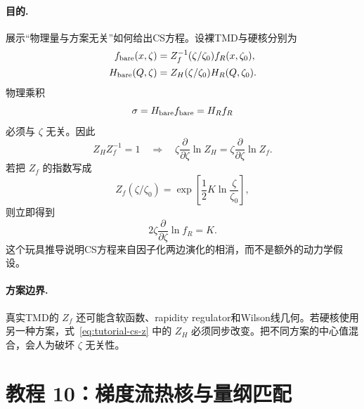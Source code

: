 \documentclass[UTF8,12pt,a4paper,twoside,openany]{ctexbook}
\begin{document}
\paragraph{目的.} 展示“物理量与方案无关”如何给出CS方程。设裸TMD与硬核分别为
\begin{align}
  f_{\rm bare}(x,\zeta)
  &=Z_f^{-1}(\zeta/\zeta_0)f_R(x,\zeta_0),\\
  H_{\rm bare}(Q,\zeta)
  &=Z_H(\zeta/\zeta_0)H_R(Q,\zeta_0).
\end{align}
物理乘积
\begin{equation}
  \sigma=H_{\rm bare}f_{\rm bare}
  =H_Rf_R
  \label{eq:tutorial-cs-product}
\end{equation}
必须与 \(\zeta\) 无关。因此
\begin{equation}
  Z_HZ_f^{-1}=1
  \quad\Longrightarrow\quad
  \zeta\frac{\partial}{\partial\zeta}\ln Z_H
  =\zeta\frac{\partial}{\partial\zeta}\ln Z_f.
  \label{eq:tutorial-cs-z}
\end{equation}
若把 \(Z_f\) 的指数写成
\begin{equation}
  Z_f(\zeta/\zeta_0)
  =\exp\left[\frac12K\ln\frac{\zeta}{\zeta_0}\right],
  \label{eq:tutorial-cs-zf}
\end{equation}
则立即得到
\begin{equation}
  2\zeta\frac{\partial}{\partial\zeta}\ln f_R
  =K.
  \label{eq:tutorial-cs-result}
\end{equation}
这个玩具推导说明CS方程来自因子化两边演化的相消，而不是额外的动力学假设。

\paragraph{方案边界.} 真实TMD的 \(Z_f\) 还可能含软函数、rapidity regulator和Wilson线几何。若硬核使用另一种方案，式~\eqref{eq:tutorial-cs-z} 中的 \(Z_H\) 必须同步改变。把不同方案的中心值混合，会人为破坏 \(\zeta\) 无关性。

\section{教程 10：梯度流热核与量纲匹配}
\end{document}
